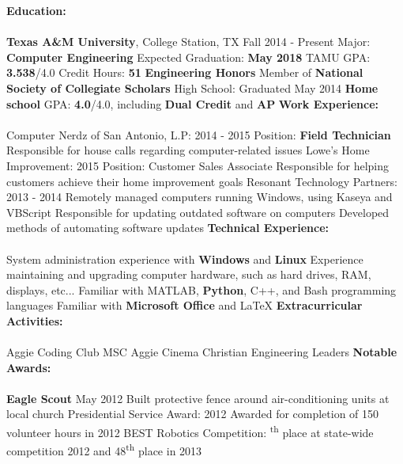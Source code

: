 \documentclass[12pt]{article}
\newcommand{\upspace}{\vspace{0px}}
\newcommand{\zzz}[1]{\upspace \0 \textbf{#1} \\ \vspace{-0.7\baselineskip} \hrulefill \vspace{-2px} \\ }
\newcommand{\aaa}{\upspace \1}
\newcommand{\bbb}{\upspace \2}
\begin{document}
\begin{flushleft}
\begin{outline}[compactitem]
\zzz{Education:}
	\aaa \textbf{Texas A\&M University}, College Station, TX \hfill Fall 2014 - Present
		\bbb Major: \textbf{Computer Engineering}
		\bbb Expected Graduation: \textbf{May 2018}
		\bbb TAMU GPA: \textbf{3.538}/4.0
		\bbb Credit Hours: \textbf{51}
		\bbb \textbf{Engineering Honors}
		\bbb Member of \textbf{National Society of Collegiate Scholars}
	\aaa High School: \hfill Graduated May 2014
		\bbb \textbf{Home school}
		\bbb GPA: \textbf{4.0}/4.0, including \textbf{Dual Credit} and \textbf{AP}
\zzz{Work Experience:}
	\aaa Computer Nerdz of San Antonio, L.P: \hfill 2014 - 2015
		\bbb Position: \textbf{Field Technician}
		\bbb Responsible for house calls regarding computer-related issues
	\aaa Lowe's Home Improvement: \hfill 2015
		\bbb Position: Customer Sales Associate
		\bbb Responsible for helping customers achieve their home improvement goals
	\aaa Resonant Technology Partners: \hfill 2013 - 2014
		\bbb Remotely managed computers running Windows, using Kaseya and VBScript
		\bbb Responsible for updating outdated software on computers
		\bbb Developed methods of automating software updates
\zzz{Technical Experience:}
	\aaa System administration experience with \textbf{Windows} and \textbf{Linux}
	\aaa Experience maintaining and upgrading computer hardware, such as hard drives, RAM, displays, etc...
	\aaa Familiar with MATLAB, \textbf{Python}, C++, and Bash programming languages
	\aaa Familiar with \textbf{Microsoft Office} and LaTeX
\zzz{Extracurricular Activities:}
	\aaa Aggie Coding Club
	\aaa MSC Aggie Cinema
	\aaa Christian Engineering Leaders
\zzz{Notable Awards:}
	\aaa \textbf{Eagle Scout} \hfill May 2012
		\bbb Built protective fence around air-conditioning units at local church
	\aaa Presidential Service Award: \hfill 2012
		\bbb Awarded for completion of 150 volunteer hours in 2012
	\aaa BEST Robotics Competition:
		\bbb 5\textsuperscript{th} place at state-wide competition 2012 and 48\textsuperscript{th} place in 2013
\end{outline}
\end{flushleft}
\end{document}
